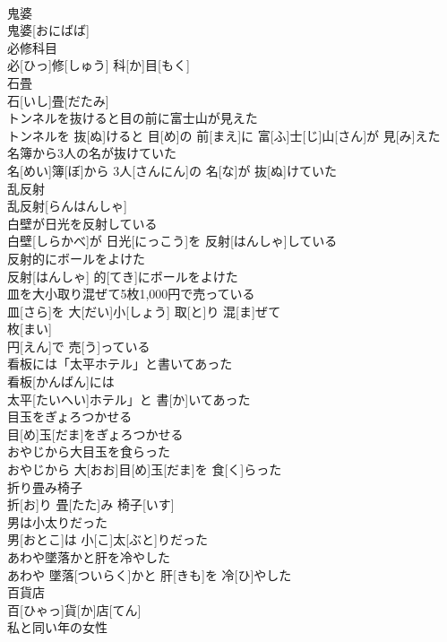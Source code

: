 \documentclass[8pt]{extreport}
\begin{document}
\begin{CJK}{UTF8}{min}
\\	鬼婆	
\\	鬼婆[おにばば]
\\	必修科目	
\\	必[ひっ]修[しゅう] 科[か]目[もく]
\\	石畳	
\\	石[いし]畳[だたみ]
\\	トンネルを抜けると目の前に富士山が見えた	
\\	トンネルを 抜[ぬ]けると 目[め]の 前[まえ]に 富[ふ]士[じ]山[さん]が 見[み]えた
\\	名簿から3人の名が抜けていた	
\\	名[めい]簿[ぼ]から 3人[さんにん]の 名[な]が 抜[ぬ]けていた
\\	乱反射	
\\	乱反射[らんはんしゃ]
\\	白壁が日光を反射している	
\\	白壁[しらかべ]が 日光[にっこう]を 反射[はんしゃ]している
\\	反射的にボールをよけた	
\\	反射[はんしゃ] 的[てき]にボールをよけた
\\	皿を大小取り混ぜて5枚1,000円で売っている	
\\	皿[さら]を 大[だい]小[しょう] 取[と]り 混[ま]ぜて 
\\	枚[まい] 
\\	円[えん]で 売[う]っている
\\	看板には「太平ホテル」と書いてあった	
\\	看板[かんばん]には
\\	太平[たいへい]ホテル」と 書[か]いてあった
\\	目玉をぎょろつかせる	
\\	目[め]玉[だま]をぎょろつかせる
\\	おやじから大目玉を食らった	
\\	おやじから 大[おお]目[め]玉[だま]を 食[く]らった
\\	折り畳み椅子	
\\	折[お]り 畳[たた]み 椅子[いす]
\\	男は小太りだった	
\\	男[おとこ]は 小[こ]太[ぶと]りだった
\\	あわや墜落かと肝を冷やした	
\\	あわや 墜落[ついらく]かと 肝[きも]を 冷[ひ]やした
\\	百貨店	
\\	百[ひゃっ]貨[か]店[てん]
\\	私と同い年の女性	

\end{CJK}
\end{document}
